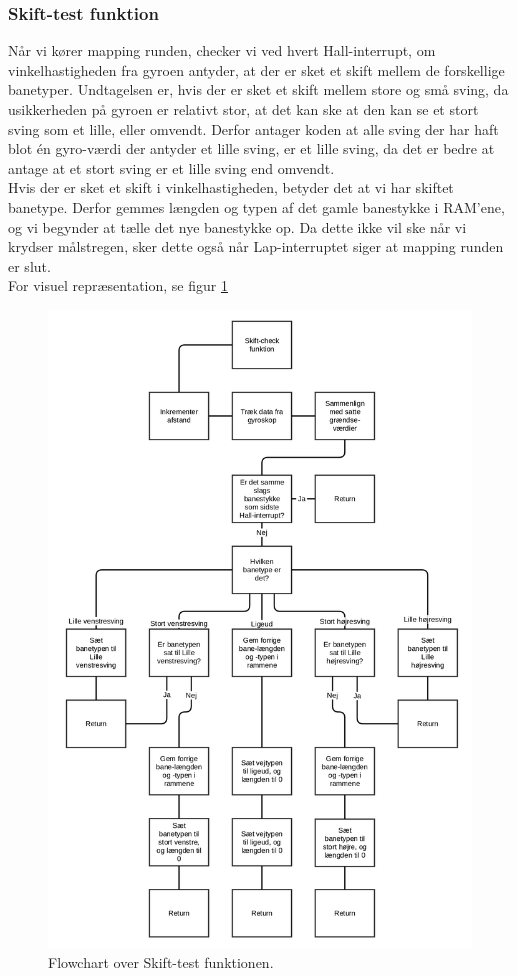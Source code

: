 \subsubsection{Skift-test funktion}
\label{Skift funktion}

Når vi kører mapping runden, checker vi ved hvert Hall-interrupt, om vinkelhastigheden fra gyroen antyder, at der er sket et skift mellem de forskellige banetyper. Undtagelsen er, hvis der er sket et skift mellem store og små sving, da usikkerheden på gyroen er relativt stor, at det kan ske at den kan se et stort sving som et lille, eller omvendt. Derfor antager koden at alle sving der har haft blot én gyro-værdi der antyder et lille sving, er et lille sving, da det er bedre at antage at et stort sving er et lille sving end omvendt. 
\\
Hvis der er sket et skift i vinkelhastigheden, betyder det at vi har skiftet banetype. Derfor gemmes længden og typen af det gamle banestykke i RAM'ene, og vi begynder at tælle det nye banestykke op. Da dette ikke vil ske når vi krydser målstregen, sker dette også når Lap-interruptet siger at mapping runden er slut.
\\
For visuel repræsentation, se figur \ref{fig:Skift Flowchart}

\begin{figure}
\centering
\includegraphics[scale=0.12]{Billeder/skift_check.png}
\caption{Flowchart over Skift-test funktionen.}
\label{fig:Skift Flowchart}
\end{figure}
